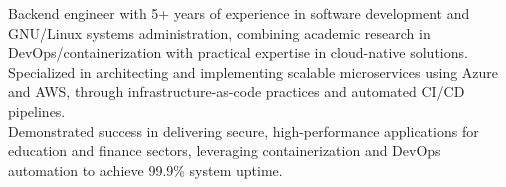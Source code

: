 \vspace{0.2cm}


\begin{minipage}[t]{1\textwidth}
    \vspace{-\baselineskip}
    Backend engineer with 5+ years of experience in software development and GNU/Linux systems administration, combining academic research in DevOps/containerization with practical expertise in cloud-native solutions. \\
    Specialized in architecting and implementing scalable microservices using Azure and AWS, through infrastructure-as-code practices and automated CI/CD pipelines. \\
    Demonstrated success in delivering secure, high-performance applications for education and finance sectors, leveraging containerization and DevOps automation to achieve 99.9\% system uptime.
\end{minipage}
